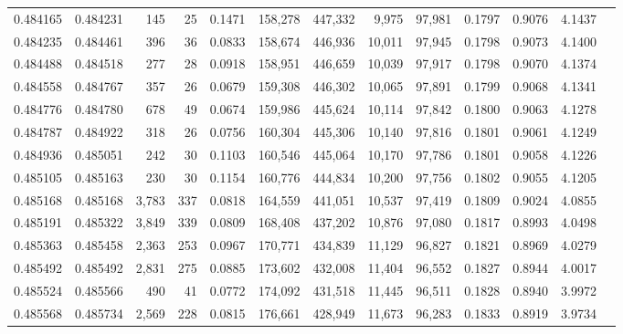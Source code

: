 \begin{tabular}{rrrrrrrrrrrrr}
0.484165 & 0.484231 &   145 &    25 &                                     0.1471 & 158,278 & 447,332 &   9,975 &  97,981 & 0.1797 & 0.9076 & 4.1437 \\
0.484235 & 0.484461 &   396 &    36 &                                     0.0833 & 158,674 & 446,936 &  10,011 &  97,945 & 0.1798 & 0.9073 & 4.1400 \\
0.484488 & 0.484518 &   277 &    28 &                                     0.0918 & 158,951 & 446,659 &  10,039 &  97,917 & 0.1798 & 0.9070 & 4.1374 \\
0.484558 & 0.484767 &   357 &    26 &                                     0.0679 & 159,308 & 446,302 &  10,065 &  97,891 & 0.1799 & 0.9068 & 4.1341 \\
0.484776 & 0.484780 &   678 &    49 &                                     0.0674 & 159,986 & 445,624 &  10,114 &  97,842 & 0.1800 & 0.9063 & 4.1278 \\
0.484787 & 0.484922 &   318 &    26 &                                     0.0756 & 160,304 & 445,306 &  10,140 &  97,816 & 0.1801 & 0.9061 & 4.1249 \\
0.484936 & 0.485051 &   242 &    30 &                                     0.1103 & 160,546 & 445,064 &  10,170 &  97,786 & 0.1801 & 0.9058 & 4.1226 \\
0.485105 & 0.485163 &   230 &    30 &                                     0.1154 & 160,776 & 444,834 &  10,200 &  97,756 & 0.1802 & 0.9055 & 4.1205 \\
0.485168 & 0.485168 & 3,783 &   337 &                                     0.0818 & 164,559 & 441,051 &  10,537 &  97,419 & 0.1809 & 0.9024 & 4.0855 \\
0.485191 & 0.485322 & 3,849 &   339 &                                     0.0809 & 168,408 & 437,202 &  10,876 &  97,080 & 0.1817 & 0.8993 & 4.0498 \\
0.485363 & 0.485458 & 2,363 &   253 &                                     0.0967 & 170,771 & 434,839 &  11,129 &  96,827 & 0.1821 & 0.8969 & 4.0279 \\
0.485492 & 0.485492 & 2,831 &   275 &                                     0.0885 & 173,602 & 432,008 &  11,404 &  96,552 & 0.1827 & 0.8944 & 4.0017 \\
0.485524 & 0.485566 &   490 &    41 &                                     0.0772 & 174,092 & 431,518 &  11,445 &  96,511 & 0.1828 & 0.8940 & 3.9972 \\
0.485568 & 0.485734 & 2,569 &   228 &                                     0.0815 & 176,661 & 428,949 &  11,673 &  96,283 & 0.1833 & 0.8919 & 3.9734 \\

\end{tabular}
